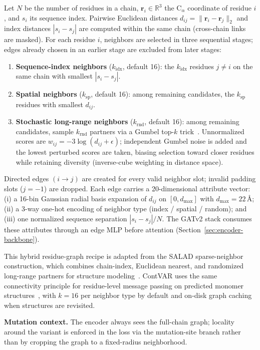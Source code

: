 \documentclass[11pt,a4paper]{article}
\begin{document}
Let $N$ be the number of residues in a chain, $\mathbf{r}_i\in\mathbb{R}^3$ the $\mathrm{C}_\alpha$ coordinate of residue $i$, and $s_i$ its sequence index. Pairwise Euclidean distances $d_{ij}=\|\mathbf{r}_i-\mathbf{r}_j\|_2$ and index distances $|s_i-s_j|$ are computed within the same chain (cross-chain links are masked). For each residue $i$, neighbors are selected in three sequential stages; edges already chosen in an earlier stage are excluded from later stages:
\begin{enumerate}
    \item \textbf{Sequence-index neighbors} ($k_{\text{idx}}$, default 16): the $k_{\text{idx}}$ residues $j\neq i$ on the same chain with smallest $|s_i-s_j|$.
    \item \textbf{Spatial neighbors} ($k_{\text{sp}}$, default 16): among remaining candidates, the $k_{\text{sp}}$ residues with smallest $d_{ij}$.
    \item \textbf{Stochastic long-range neighbors} ($k_{\text{rnd}}$, default 16): among remaining candidates, sample $k_{\text{rnd}}$ partners via a Gumbel top-$k$ trick~\cite{kool2019stochastic}. Unnormalized scores are $w_{ij}=-3\log(d_{ij}+\epsilon)$; independent Gumbel noise is added and the lowest perturbed scores are taken, biasing selection toward closer residues while retaining diversity (inverse-cube weighting in distance space).
\end{enumerate}
Directed edges $(i\to j)$ are created for every valid neighbor slot; invalid padding slots ($j=-1$) are dropped. Each edge carries a 20-dimensional attribute vector: (i) a 16-bin Gaussian radial basis expansion of $d_{ij}$ on $[0,d_{\max}]$ with $d_{\max}=22$\,\AA; (ii) a 3-way one-hot encoding of neighbor type (index / spatial / random); and (iii) one normalized sequence separation $|s_i-s_j|/N$. The GATv2 stack consumes these attributes through an edge MLP before attention (Section~\ref{sec:encoder-backbone}).

This hybrid residue-graph recipe is adapted from the SALAD sparse-neighbor construction, which combines chain-index, Euclidean nearest, and randomized long-range partners for structure modeling~\cite{jendrusch2025salad}. ContVAR uses the same connectivity principle for residue-level message passing on predicted monomer structures~\cite{jumper2021highly}, with $k{=}16$ per neighbor type by default and on-disk graph caching when structures are revisited.

\textbf{Mutation context.} The encoder always sees the full-chain graph; locality around the variant is enforced in the loss via the mutation-site branch rather than by cropping the graph to a fixed-radius neighborhood.
\end{document}
